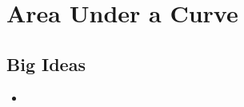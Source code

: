 \chapter{Area Under a Curve}
\label{chap:AUC}

\section{Big Ideas}
\label{sec:AUC Big Ideas}
\begin{itemize}
  \item 
\end{itemize}
